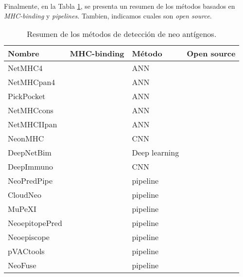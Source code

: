 Finalmente, en la Tabla \ref{tab:review}, se presenta un resumen de los métodos basados en \textit{MHC-binding} y \textit{pipelines}. Tambien, indicamos cuales son \textit{open source}.\\

\begin{table}[H]
	\centering
	\caption{Resumen de los métodos de detección de neo antígenos.}
	\label{tab:review}
	\begin{tabular}{llll}
		\hline
		\textbf{Nombre} & \textbf{MHC-binding} & \textbf{Método} & \textbf{Open source} \\ \hline
		NetMHC4         & \checkmark            & ANN             &                      \\
		NetMHCpan4      & \checkmark            & ANN             &                      \\
		PickPocket      & \checkmark            & ANN             &                      \\
		NetMHCcons      & \checkmark            & ANN             &                      \\
		NetMHCIIpan     & \checkmark            & ANN             &                      \\
		NeonMHC         & \checkmark            & CNN             &                      \\
		DeepNetBim      & \checkmark            & Deep learning   & \checkmark            \\
		DeepImmuno      & \checkmark            & CNN             &                      \\
		NeoPredPipe     &                      & pipeline        & \checkmark            \\
		CloudNeo        &                      & pipeline        &                      \\
		MuPeXI          &                      & pipeline        &                      \\
		NeoepitopePred  &                      & pipeline        &                      \\
		Neoepiscope     &                      & pipeline        &                      \\
		pVACtools       &                      & pipeline        & \checkmark            \\
		NeoFuse         &                      & pipeline        & \checkmark    \\   \hline    
	\end{tabular}
\end{table}
